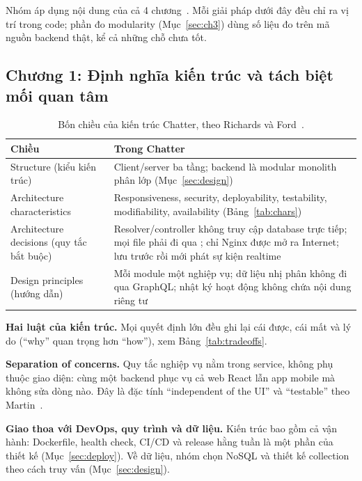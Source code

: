 \documentclass[11pt, a4paper]{article}
\begin{document}
Nhóm áp dụng nội dung của cả 4 chương~\cite{phat2025slides}. Mỗi giải pháp dưới đây đều chỉ ra vị trí trong code; phần đo modularity (Mục~\ref{sec:ch3}) dùng số liệu đo trên mã nguồn backend thật, kể cả những chỗ chưa tốt.

\subsection{Chương 1: Định nghĩa kiến trúc và tách biệt mối quan tâm}

\begin{table}[H]
  \centering
  \small
  \caption{Bốn chiều của kiến trúc Chatter, theo Richards và Ford~\cite{richards2020fundamentals}.}
  \label{tab:4dim}
  \begin{tabularx}{\linewidth}{lY}
    \toprule
    \textbf{Chiều} & \textbf{Trong Chatter} \\
    \midrule
    Structure (kiểu kiến trúc) & Client/server ba tầng; backend là modular monolith phân lớp (Mục~\ref{sec:design}) \\
    Architecture characteristics & Responsiveness, security, deployability, testability, modifiability, availability (Bảng~\ref{tab:chars}) \\
    Architecture decisions (quy tắc bắt buộc) & Resolver/controller không truy cập database trực tiếp; mọi file phải đi qua ; chỉ Nginx được mở ra Internet; lưu trước rồi mới phát sự kiện realtime \\
    Design principles (hướng dẫn) & Mỗi module một nghiệp vụ; dữ liệu nhị phân không đi qua GraphQL; nhật ký hoạt động không chứa nội dung riêng tư \\
    \bottomrule
  \end{tabularx}
\end{table}

\textbf{Hai luật của kiến trúc.} Mọi quyết định lớn đều ghi lại cái được, cái mất và lý do (``why'' quan trọng hơn ``how''), xem Bảng~\ref{tab:tradeoffs}.

\textbf{Separation of concerns.} Quy tắc nghiệp vụ nằm trong service, không phụ thuộc giao diện: cùng một backend phục vụ cả web React lẫn app mobile mà không sửa dòng nào. Đây là đặc tính ``independent of the UI'' và ``testable'' theo Martin~\cite{martin2017clean}.

\textbf{Giao thoa với DevOps, quy trình và dữ liệu.} Kiến trúc bao gồm cả vận hành: Dockerfile, health check, CI/CD và release hằng tuần là một phần của thiết kế (Mục~\ref{sec:deploy}). Về dữ liệu, nhóm chọn NoSQL và thiết kế collection theo cách truy vấn (Mục~\ref{sec:design}).
\end{document}

